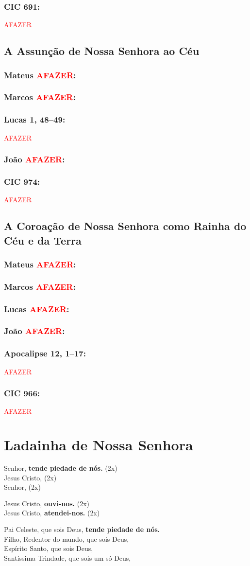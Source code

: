 \documentclass[10pt,a5paper]{book}
\newcommand{\from}[1]{\subsection*{#1}}
\newcommand{\TODO}{\textcolor{red}{\ttfamily AFAZER}}
\begin{document}
\from{CIC 691:}

\TODO


\section{A Assunção de Nossa Senhora ao Céu}

\from{Mateus \TODO:}

\from{Marcos \TODO:}

\from{Lucas 1, 48--49:}

\TODO

\from{João \TODO:}

\from{CIC 974:}

\TODO


\section{A Coroação de Nossa Senhora como Rainha do Céu e da Terra}

\from{Mateus \TODO:}

\from{Marcos \TODO:}

\from{Lucas \TODO:}

\from{João \TODO:}

\from{Apocalipse 12, 1--17:}

\TODO

\from{CIC 966:}

\TODO


\chapter{Ladainha de Nossa Senhora}

Senhor, \textbf{tende piedade de nós.} (2x) \\
Jesus Cristo, (2x) \\
Senhor, (2x)

Jesus Cristo, \textbf{ouvi-nos.} (2x) \\
Jesus Cristo, \textbf{atendei-nos.} (2x)

Pai Celeste, que sois Deus, \textbf{tende piedade de nós.} \\
Filho, Redentor do mundo, que sois Deus, \\
Espírito Santo, que sois Deus, \\
Santíssima Trindade, que sois um só Deus,
\end{document}
